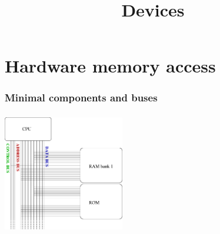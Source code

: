 %
%
%
%
%
%

%
%


%
%

\def\path{../../../..}

%
%



%
%

\title{Devices}

%
%



%
%

\begin{frame}
  \titlepage
\end{frame}

%
%

\begin{frame}
        \tableofcontents
\end{frame}

\section{Hardware memory access}
\begin{frame}
  \frametitle{Minimal components and buses}
  \begin{center}
    \includegraphics[width=150pt,height=150pt]{figures/arch-basic}
  \end{center}
\end{frame}


